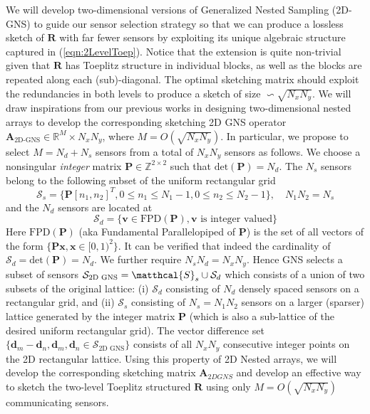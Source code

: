 \begin{enumerate}
\noindent We will develop two-dimensional versions of Generalized Nested Sampling (2D-GNS) to guide our sensor selection strategy so that we can produce a lossless sketch of $\mathbf{R}$ with far fewer sensors by exploiting its unique algebraic structure captured in (\ref{eqn:2LevelToep}). Notice that the extension is quite non-trivial given that $\mathbf{R}$ has Toeplitz structure in individual blocks, as well as the blocks are repeated along each (sub)-diagonal. The optimal sketching matrix should exploit the redundancies in both levels to produce a sketch of size $\backsim \sqrt{N_xN_y}$. We will draw inspirations from our previous works in designing two-dimensional nested arrays to develop the corresponding sketching 2D GNS operator $\mathbf{A}_{\text{2D-GNS}} \in \mathbb{R}^M \times {N_xN_y}$, where $M = O(\sqrt{N_xN_y})$. In particular, we propose to select $M=N_d+N_s$ sensors from a total of $N_xN_y$ sensors as follows. We choose a nonsingular {\em integer} matrix $\mathbf{P}\in \mathbb{Z}^{2\times 2}$ such that $\text{det}(\mathbf{P})=N_d$. The $N_s$ sensors belong to the following subset  of the uniform rectangular grid \[ \mathcal{S}_{s} = \{\mathbf{P}[n_1,n_2]^{T}, 0\leq n_1\leq N_1-1, 0\leq n_2\leq N_2-1 \} ,\quad N_1N_2 = N_s \]
and the $N_d$ sensors are located at \[ \mathcal{S}_d = \{ \mathbf{v} \in \text{FPD}(\mathbf{P}), \mathbf{v} \text{ is integer valued} \} \] 
Here $\text{FPD}(\mathbf{P})$ (aka Fundamental Parallelopiped of $\mathbf{P}$)  is the set of all vectors of the form $\{\mathbf{Px}, \mathbf{x}\in[0,1)^2 \}$. It can be verified that indeed the cardinality of $\mathcal{S}_d = \text{det}(\mathbf{P}) = N_d$. We further require $N_sN_d = N_xN_y$. Hence GNS selects a subset of sensors $\mathcal{S}_{\text{2D GNS}} = \matthcal{S}_s\cup \mathcal{S}_d$ which consists of a union of two subsets of the original lattice: (i) $\mathcal{S}_d$ consisting of $N_d$ densely spaced sensors on a rectangular grid, and (ii) $\mathcal{S}_s$ consisting of $N_s = N_1N_2$ sensors on a larger (sparser) lattice generated by the integer matrix $\mathbf{P}$ (which is also a sub-lattice of the desired uniform rectangular grid). The vector difference set $\{\mathbf{d}_m-\mathbf{d}_n, \mathbf{d}_m,\mathbf{d}_n\in \mathcal{S}_{\text{2D GNS}}\}$ consists of all $N_xN_y$ consecutive integer points on the 2D rectangular lattice. Using this property of 2D Nested arrays, we will develop the corresponding sketching matrix $\mathbf{A}_{2D GNS}$ and develop an effective way to sketch the two-level Toeplitz structured $\mathbf{R}$ using only $M = O(\sqrt{N_xN_y})$ communicating sensors. 


\end{enumerate}
